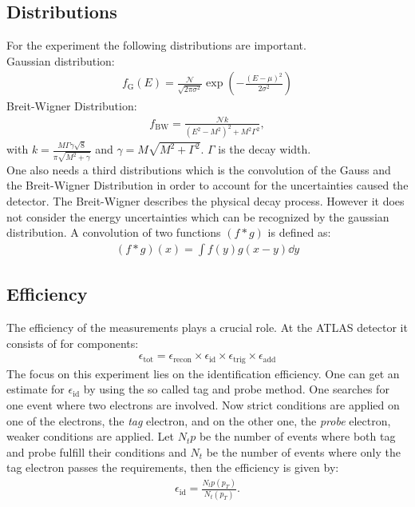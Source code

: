 \documentclass[12pt, a4paper, bibliography=totoc]{scrartcl}
\begin{document}
\begin{multicols}{2}
\subsection{Distributions}
For the experiment the following distributions are important.\\
Gaussian distribution:
\begin{align}
    f_{\text{G}} (E) = \frac{\mathcal{N}}{\sqrt{2 \pi \sigma^2}} \exp \left( - \frac{(E - \mu )^2}{2 \sigma^2} \right)
\end{align}
Breit-Wigner Distribution:
\begin{align}
    f_{\text{BW}} = \frac{\mathcal{N} k}{(E^2 - M^2)^2 + M^2 \Gamma^2} ,
\end{align}
with $k = \frac{M\Gamma \gamma \sqrt{8}}{\pi \sqrt{M^2 + \gamma}}$ and $\gamma = M \sqrt{M^2 + \Gamma^2}$. $\Gamma$ is the decay width.\\
One also needs a third distributions which is the convolution of the Gauss and the Breit-Wigner Distribution in order to account for the uncertainties caused the detector.
The Breit-Wigner describes the physical decay process. 
However it does not consider the energy uncertainties which can be recognized by the gaussian distribution.
A convolution of two functions $(f \ast g)$ is defined as:
\begin{align}
    (f \ast g) (x) = \int f(y)g(x-y)\dd y
\end{align}

\subsection{Efficiency}

The efficiency of the measurements plays a crucial role. 
At the ATLAS detector it consists of for components:
\begin{align}
     \epsilon_{\text{tot}} =  \epsilon_{\text{recon}} \times \epsilon_{\text{id}} \times \epsilon_{\text{trig}} \times \epsilon_{\text{add}} 
\end{align}
The focus on this experiment lies on the identification efficiency.
One can get an estimate for $\epsilon_{\text{id}}$ by using the so called tag and probe method.
One searches for one event where two electrons are involved. 
Now strict conditions are applied on one of the electrons, the \textit{tag} electron, 
and on the other one, the \textit{probe} electron, weaker conditions are applied.
Let $N_tp$ be the number of events where both tag and probe fulfill their conditions and $N_t$ be the number of events where only the tag electron passes the requirements, then the efficiency is given by:
\begin{align}
    \epsilon_{\text{id}} = \frac{N_tp (p_T)}{N_t(p_T)}.
\end{align}



\end{multicols}
\end{document}
